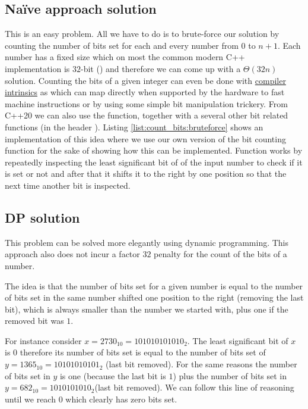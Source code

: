 \subsection{Na\"ive approach solution}
\label{count_bits:sec:bruteforce}
This is an easy problem. All we have to do is to brute-force our solution by counting
the number of bits set for each and every number from $0$ to $n+1$. Each number has a fixed size
which on most the common modern C++ implementation is $32$-bit () and therefore
we can come up with a $\Theta(32n)$ solution. Counting the bits of a given integer can even be done
with
\href{https://gcc.gnu.org/onlinedocs/gcc-4.9.2/gcc/X86-Built-in-Functions.html}{compiler intrinsics}
as  which can map directly when supported by the hardware to fast
machine instructions or by using some simple bit manipulation trickery. From C++20 we can also use
the  function, together with a several other  bit related functions (in the
header ). Listing \ref{list:count_bits:bruteforce} shows an implementation of this
idea where we use our own version of the bit counting function  for the sake of
showing how this can be implemented. Function  works by repeatedly inspecting
the least significant bit of of the input number to check if it is set or not and after that it
shifts it to the right by one position so that the next time another bit is inspected.


\subsection{DP solution}
\label{count_bits:sec:dp}
This problem can be solved more elegantly using dynamic programming. This approach also does
not incur a factor $32$ penalty for the count of the bits of a number.

The idea is that the number of bits set for a given number is equal to the number of bits set in the
same number shifted one position to the right (removing the last bit), which is always smaller than
the number we started with, plus one if the removed bit was $1$.

For instance consider $x=2730_{10} = 101010101010_2$. The least significant bit of $x$ is $0$
therefore its number of bits set is equal to the number of bits set of $y=1365_{10} = 10101010101_2$
(last bit removed). For the same reasons the number of bits set in $y$ is one (because the last bit
is $1$) plus the number of bits set in $y=682_{10} = 1010101010_2$(last bit removed). We can follow
this line of reasoning until we reach $0$ which clearly has zero bits set.


